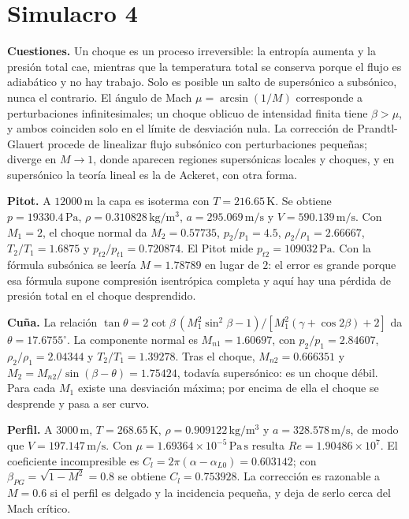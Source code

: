 \section{Simulacro 4}
\textbf{Cuestiones.} Un choque es un proceso irreversible: la entropía aumenta y la presión total cae, mientras que la temperatura total se conserva porque el flujo es adiabático y no hay trabajo. Solo es posible un salto de supersónico a subsónico, nunca el contrario. El ángulo de Mach $\mu=\arcsin(1/M)$ corresponde a perturbaciones infinitesimales; un choque oblicuo de intensidad finita tiene $\beta>\mu$, y ambos coinciden solo en el límite de desviación nula. La corrección de Prandtl-Glauert procede de linealizar flujo subsónico con perturbaciones pequeñas; diverge en $M\to1$, donde aparecen regiones supersónicas locales y choques, y en supersónico la teoría lineal es la de Ackeret, con otra forma.

\textbf{Pitot.} A $12000\,\mathrm m$ la capa es isoterma con $T=216.65\,\mathrm K$. Se obtiene $p=19330.4\,\mathrm{Pa}$, $\rho=0.310828\,\mathrm{kg/m^3}$, $a=295.069\,\mathrm{m/s}$ y $V=590.139\,\mathrm{m/s}$. Con $M_1=2$, el choque normal da $M_2=0.57735$, $p_2/p_1=4.5$, $\rho_2/\rho_1=2.66667$, $T_2/T_1=1.6875$ y $p_{t2}/p_{t1}=0.720874$. El Pitot mide $p_{t2}=109032\,\mathrm{Pa}$. Con la fórmula subsónica se leería $M=1.78789$ en lugar de $2$: el error es grande porque esa fórmula supone compresión isentrópica completa y aquí hay una pérdida de presión total en el choque desprendido.

\textbf{Cuña.} La relación $\tan\theta=2\cot\beta\,(M_1^2\sin^2\beta-1)/[M_1^2(\gamma+\cos2\beta)+2]$ da $\theta=17.6755^\circ$. La componente normal es $M_{n1}=1.60697$, con $p_2/p_1=2.84607$, $\rho_2/\rho_1=2.04344$ y $T_2/T_1=1.39278$. Tras el choque, $M_{n2}=0.666351$ y $M_2=M_{n2}/\sin(\beta-\theta)=1.75424$, todavía supersónico: es un choque débil. Para cada $M_1$ existe una desviación máxima; por encima de ella el choque se desprende y pasa a ser curvo.

\textbf{Perfil.} A $3000\,\mathrm m$, $T=268.65\,\mathrm K$, $\rho=0.909122\,\mathrm{kg/m^3}$ y $a=328.578\,\mathrm{m/s}$, de modo que $V=197.147\,\mathrm{m/s}$. Con $\mu=1.69364\times10^{-5}\,\mathrm{Pa\,s}$ resulta $Re=1.90486\times10^{7}$. El coeficiente incompresible es $C_l=2\pi(\alpha-\alpha_{L0})=0.603142$; con $\beta_{PG}=\sqrt{1-M^2}=0.8$ se obtiene $C_l=0.753928$. La corrección es razonable a $M=0.6$ si el perfil es delgado y la incidencia pequeña, y deja de serlo cerca del Mach crítico.

